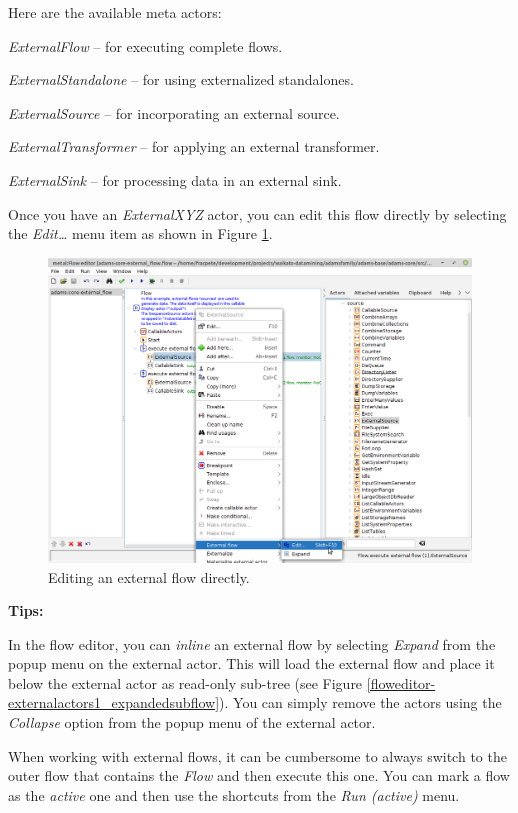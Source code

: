 Here are the available meta actors:
\begin{tight_itemize}
	\item \textit{ExternalFlow} -- for executing complete flows.
	\item \textit{ExternalStandalone} -- for using externalized standalones.
	\item \textit{ExternalSource} -- for incorporating an external source.
	\item \textit{ExternalTransformer} -- for applying an external transformer.
	\item \textit{ExternalSink} -- for processing data in an external sink.
\end{tight_itemize}

Once you have an \textit{ExternalXYZ} actor, you can edit this flow directly by 
selecting the \textit{Edit\ldots} menu item as shown in Figure 
\ref{floweditor-externalactors1_editsubflow}.
\begin{figure}[htb]
  \centering
  \includegraphics[width=12.0cm]{images/floweditor-externalactors1_editsubflow.png}
  \caption{Editing an external flow directly.}
  \label{floweditor-externalactors1_editsubflow}
\end{figure}

\textbf{Tips:}
\begin{tight_itemize}
  \item In the flow editor, you can \textit{inline} an external flow by
  selecting \textit{Expand} from the popup menu on the external
  actor. This will load the external flow and place it below the external actor
  as read-only sub-tree (see Figure \ref{floweditor-externalactors1_expandedsubflow}). You can simply remove the actors using the
  \textit{Collapse} option from the popup menu of the external actor.
  \item When working with external flows, it can be cumbersome to always switch
  to the outer flow that contains the \textit{Flow} and then execute this one.
  You can mark a flow as the \textit{active} one and then use the shortcuts
  from the \textit{Run (active)} menu.
\end{tight_itemize}

